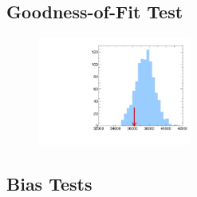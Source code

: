 \subsection{Goodness-of-Fit Test}

\begin{figure}[htbp]
  \centering
  \includegraphics[width=0.45\textwidth]{fig/fitValidation/saturated_WprToWH1000_74.pdf}
  \caption{
  }
  \label{fig:GOF}
\end{figure}

\subsection{Bias Tests}

